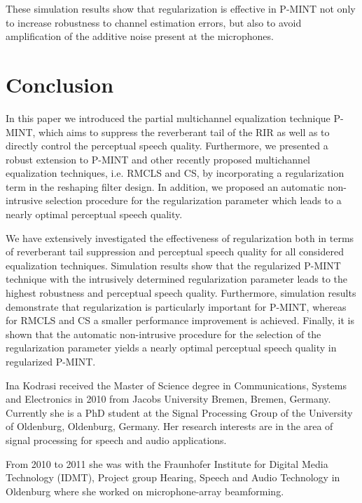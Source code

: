 \documentclass[10pt]{IEEEtran}
\begin{document}
These simulation results show that regularization is effective in P-MINT not only to increase robustness to channel estimation errors, but also to avoid amplification of the additive noise present at the microphones. 
\section{Conclusion}
In this paper we introduced the partial multichannel equalization technique P-MINT, which aims to suppress the reverberant tail of the RIR as well as to directly control the perceptual speech quality.
Furthermore, we presented a robust extension to P-MINT and other recently proposed multichannel equalization techniques, i.e. RMCLS and CS, by incorporating a regularization term in the reshaping filter design.
In addition, we proposed an automatic non-intrusive selection procedure for the regularization parameter which leads to a nearly optimal perceptual speech quality.

We have extensively investigated the effectiveness of regularization both in terms of reverberant tail suppression and perceptual speech quality for all considered equalization techniques.
Simulation results show that the regularized P-MINT technique with the intrusively determined regularization parameter leads to the highest robustness and perceptual speech quality.
Furthermore, simulation results demonstrate that regularization is particularly important for P-MINT, whereas for RMCLS and CS a smaller performance improvement is achieved.
Finally, it is shown that the automatic non-intrusive procedure for the selection of the regularization parameter yields a nearly optimal perceptual speech quality in regularized P-MINT.





\vspace{-0.92cm}
\begin{IEEEbiography}
{Ina Kodrasi} received the Master of Science degree in Communications, Systems and Electronics in 2010 from Jacobs University Bremen, Bremen, Germany.
Currently she is a PhD student at the Signal Processing Group of the University of Oldenburg, Oldenburg, Germany.
Her research interests are in the area of signal processing for speech and audio applications.

From 2010 to 2011 she was with the Fraunhofer Institute for Digital Media Technology (IDMT), Project group
Hearing, Speech and Audio Technology in Oldenburg where she worked on microphone-array beamforming.
\vspace{-1.02cm}
\end{IEEEbiography}
\end{document}
